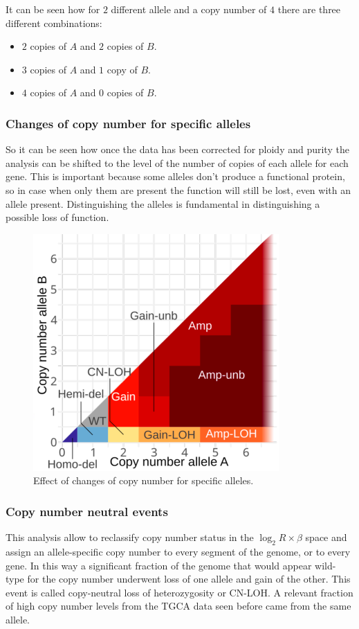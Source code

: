   It can be seen how for $2$ different allele and a copy number of $4$ there are three different combinations:

  \begin{itemize}
    \item $2$ copies of $A$ and $2$ copies of $B$.
    \item $3$ copies of $A$ and $1$ copy of $B$.
    \item $4$ copies of $A$ and $0$ copies of $B$.
  \end{itemize}

    \subsubsection{Changes of copy number for specific alleles}
    So it can be seen how once the data has been corrected for ploidy and purity the analysis can be shifted to the level of the number of copies of each allele for each gene.
    This is important because some alleles don't produce a functional protein, so in case when only them are present the function will still be lost, even with an allele present.
    Distinguishing the alleles is fundamental in distinguishing a possible loss of function.

    \begin{figure}[H]
      \centering
      \includegraphics[width=0.3\linewidth]{image13.png}
      \caption{Effect of changes of copy number for specific alleles.}
      \label{fig:img13}
    \end{figure}

    \subsubsection{Copy number neutral events}
    This analysis allow to reclassify copy number status in the $\log_2 R\times \beta$ space and assign an allele-specific copy number to every segment of the genome, or to every gene.
    In this way a significant fraction of the genome that would appear wild-type for the copy number underwent loss of one allele and gain of the other.
    This event is called copy-neutral loss of heterozygosity or CN-LOH.
    A relevant fraction of high copy number levels from the TGCA data seen before came from the same allele.

